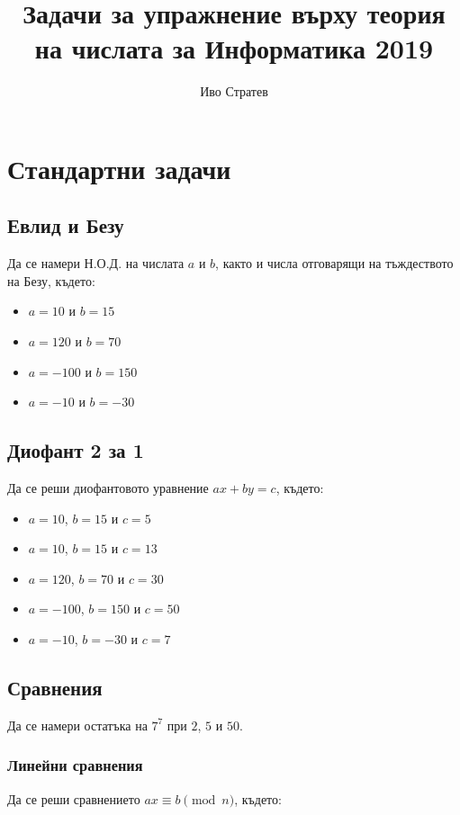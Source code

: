 \documentclass[12pt]{article}
\title{Задачи за упражнение върху теория на числата за Информатика 2019}
\author{Иво Стратев}
\begin{document}
\maketitle

\section*{Стандартни задачи}

\subsection*{Евлид и Безу}
Да се намери Н.О.Д. на числата \(a\) и \(b\), както и числа отговарящи на тъждеството на Безу, където:

\begin{itemize}
    \item \(a = 10\) и \(b = 15\)
    \item \(a = 120\) и \(b = 70\)
    \item \(a = -100\) и \(b = 150\)
    \item \(a = -10\) и \(b = -30\)
\end{itemize}

\subsection*{Диофант 2 за 1}
Да се реши диофантовото уравнение \(ax + by = c\), където:

\begin{itemize}
    \item \(a = 10\), \(b = 15\) и \(c = 5\)
    \item \(a = 10\), \(b = 15\) и \(c = 13\)
    \item \(a = 120\), \(b = 70\) и \(c = 30\)
    \item \(a = -100\), \(b = 150\) и \(c = 50\)
    \item \(a = -10\), \(b = -30\) и \(c = 7\)
\end{itemize}

\subsection*{Сравнения}

Да се намери остатъка на \(7^7\) при \(2\), \(5\) и \(50\).

\subsubsection*{Линейни сравнения}
Да се реши сравнението \(ax \equiv b \pmod{n}\), където:
\end{document}

